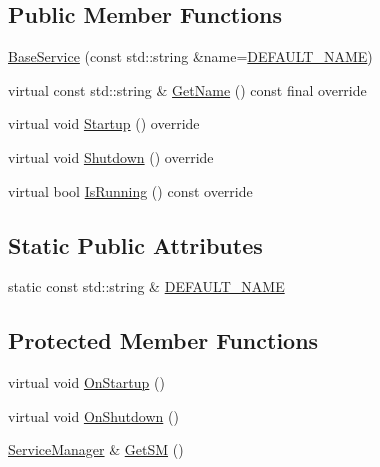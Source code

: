 \subsection*{Public Member Functions}
\begin{DoxyCompactItemize}
\item 
\hyperlink{classastu_1_1BaseService_ab155c73d180c22dab7cf8aff1514b2b5}{Base\+Service} (const std\+::string \&name=\hyperlink{classastu_1_1BaseService_a9483b26ad631bd14646ef2d2170cd828}{D\+E\+F\+A\+U\+L\+T\+\_\+\+N\+A\+ME})
\item 
virtual const std\+::string \& \hyperlink{classastu_1_1BaseService_a42eb6e0d667215ef635682d2a12e1631}{Get\+Name} () const final override
\item 
virtual void \hyperlink{classastu_1_1BaseService_a59dade033dcb44dd32155c526a3a58e2}{Startup} () override
\item 
virtual void \hyperlink{classastu_1_1BaseService_a7095888244052db294d58738c0d187fb}{Shutdown} () override
\item 
virtual bool \hyperlink{classastu_1_1BaseService_af6f4641c045343d329a0fc1ecc6a9778}{Is\+Running} () const override
\end{DoxyCompactItemize}
\subsection*{Static Public Attributes}
\begin{DoxyCompactItemize}
\item 
static const std\+::string \& \hyperlink{classastu_1_1BaseService_a9483b26ad631bd14646ef2d2170cd828}{D\+E\+F\+A\+U\+L\+T\+\_\+\+N\+A\+ME}
\end{DoxyCompactItemize}
\subsection*{Protected Member Functions}
\begin{DoxyCompactItemize}
\item 
virtual void \hyperlink{classastu_1_1BaseService_ac8710cd2d6dcc990db65e7c8ccfbc5ff}{On\+Startup} ()
\item 
virtual void \hyperlink{classastu_1_1BaseService_aeb5003f7c5efe5412725ac4c66942d03}{On\+Shutdown} ()
\item 
\hyperlink{classastu_1_1ServiceManager}{Service\+Manager} \& \hyperlink{classastu_1_1BaseService_a646b6c83a9ebd26fe4e7796b5afde612}{Get\+SM} ()
\end{DoxyCompactItemize}


